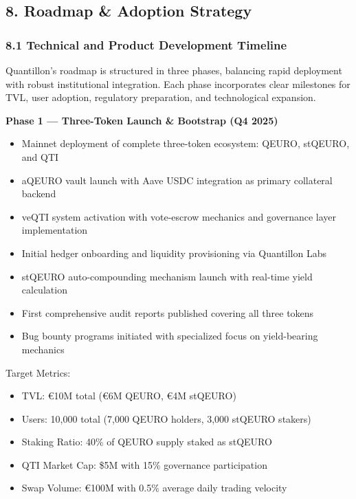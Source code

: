 \hypertarget{roadmap-adoption-strategy}{%
\subsection{8. Roadmap \& Adoption
Strategy}\label{roadmap-adoption-strategy}}

\hypertarget{technical-and-product-development-timeline}{%
\subsubsection{8.1 Technical and Product Development
Timeline}\label{technical-and-product-development-timeline}}

Quantillon's roadmap is structured in three phases, balancing rapid
deployment with robust institutional integration. Each phase
incorporates clear milestones for TVL, user adoption, regulatory
preparation, and technological expansion.

\textbf{Phase 1 --- Three-Token Launch \& Bootstrap (Q4 2025)}

\begin{itemize}
\item
  Mainnet deployment of complete three-token ecosystem: QEURO, stQEURO,
  and QTI
\item
  aQEURO vault launch with Aave USDC integration as primary collateral
  backend
\item
  veQTI system activation with vote-escrow mechanics and governance
  layer implementation
\item
  Initial hedger onboarding and liquidity provisioning via Quantillon
  Labs
\item
  stQEURO auto-compounding mechanism launch with real-time yield
  calculation
\item
  First comprehensive audit reports published covering all three tokens
\item
  Bug bounty programs initiated with specialized focus on yield-bearing
  mechanics
\end{itemize}

Target Metrics:

\begin{itemize}
\item
  TVL: €10M total (€6M QEURO, €4M stQEURO)
\item
  Users: 10,000 total (7,000 QEURO holders, 3,000 stQEURO stakers)
\item
  Staking Ratio: 40\% of QEURO supply staked as stQEURO
\item
  QTI Market Cap: \$5M with 15\% governance participation
\item
  Swap Volume: €100M with 0.5\% average daily trading velocity
\end{itemize}

